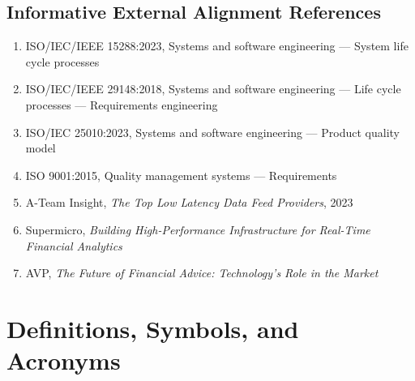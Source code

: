 \documentclass[11pt]{report}
\begin{document}
\section{Informative External Alignment References}
\begin{enumerate}[leftmargin=1.2cm]
    \item ISO/IEC/IEEE 15288:2023, Systems and software engineering --- System life cycle processes
    \item ISO/IEC/IEEE 29148:2018, Systems and software engineering --- Life cycle processes --- Requirements engineering
    \item ISO/IEC 25010:2023, Systems and software engineering --- Product quality model
    \item ISO 9001:2015, Quality management systems --- Requirements
    \item A-Team Insight, \emph{The Top Low Latency Data Feed Providers}, 2023
    \item Supermicro, \emph{Building High-Performance Infrastructure for Real-Time Financial Analytics}
    \item AVP, \emph{The Future of Financial Advice: Technology's Role in the Market}
\end{enumerate}

\chapter{Definitions, Symbols, and Acronyms}
\end{document}
